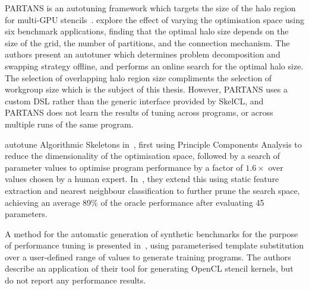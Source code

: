 \documentclass[nonatbib,preprint,10pt]{sigplanconf}
\begin{document}

PARTANS is an autotuning framework which targets the size of the halo
region for multi-GPU stencils~\cite{Lutz2013}. \citeauthor{Lutz2013}
explore the effect of varying the optimisation space using six
benchmark applications, finding that the optimal halo size depends on
the size of the grid, the number of partitions, and the connection
mechanism. The authors present an autotuner which determines problem
decomposition and swapping strategy offline, and performs an online
search for the optimal halo size. The selection of overlapping halo
region size compliments the selection of workgroup size which is the
subject of this thesis. However, PARTANS uses a custom DSL rather than
the generic interface provided by SkelCL, and PARTANS does not learn
the results of tuning across programs, or across multiple runs of the
same program.

\citeauthor{Collins2012} autotune Algorithmic Skeletons
in~\cite{Collins2012}, first using Principle Components Analysis to
reduce the dimensionality of the optimisation space, followed by a
search of parameter values to optimise program performance by a factor
of $1.6\times$ over values chosen by a human
expert. In~\cite{Collins2013}, they extend this using static feature
extraction and nearest neighbour classification to further prune the
search space, achieving an average 89\% of the oracle performance
after evaluating 45 parameters.

A method for the automatic generation of synthetic benchmarks for the
purpose of performance tuning is presented in~\cite{Chiu2015}, using
parameterised template substitution over a user-defined range of
values to generate training programs. The authors describe an
application of their tool for generating OpenCL stencil kernels, but
do not report any performance results.
\end{document}

